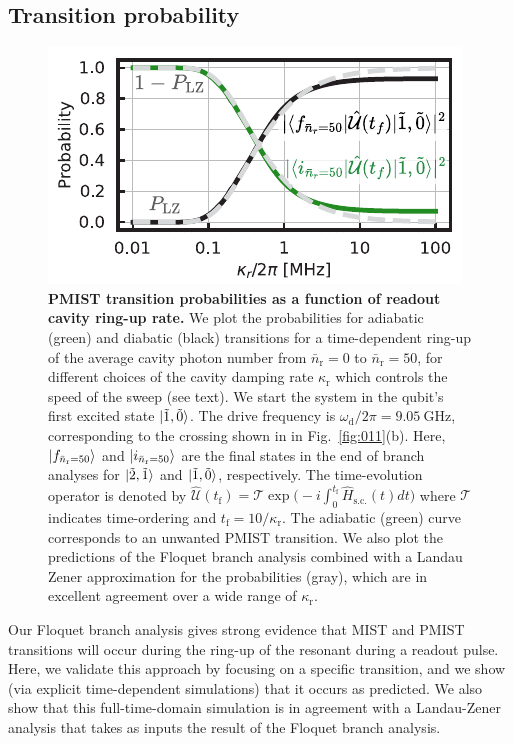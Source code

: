 \documentclass[%
reprint,
superscriptaddress,
 amsmath,amssymb,
 aps,
 prx,
longbibliography,
floatfix,
]{revtex4-2}
\begin{document}
\subsection{Transition probability}\label{sec:LZ}
\begin{figure}[t]
    \centering
    \includegraphics[width=\linewidth]{Figures/LZ.pdf}
    \caption{
    {\bf PMIST transition probabilities as a function of readout cavity ring-up rate.}
    We plot the probabilities for adiabatic (green) and diabatic (black) transitions for a time-dependent ring-up of the average cavity photon number from $\bar{n}_\textrm{r} = 0$ to $\bar{n}_\textrm{r} = 50$, for different choices of the cavity damping rate $\kappa_\textrm{r}$ which controls the speed of the sweep (see text).  We start the system in the qubit's first excited state $\ket{\tilde{1},\tilde{0}}$.  The drive frequency is $\omega_\textrm{d}/2\pi=9.05 \ \mathrm{GHz}$, corresponding to the crossing shown in in Fig.~\ref{fig:011}(b).
    Here, $\ket{f_{\bar n_\textrm{r}=50}}$ and $\ket{i_{\bar n_\textrm{r}=50}}$ are the final states in the end of branch analyses for $\ket{\tilde{2},\tilde{1}}$ and $\ket{\tilde{1},\tilde{0}}$, respectively. The time-evolution operator is denoted by $ \hat{\mathcal{U}}(t_\textrm{f})=\mathcal{T}\exp\big(-i\int^{t_\mathrm{f}}_{0} \hat H_\textrm{s.c.}(t)dt\big)$ where $\mathcal{T}$ indicates time-ordering and $t_\textrm{f}=10/\kappa_\textrm{r}$. The adiabatic (green) curve corresponds to an unwanted PMIST transition.  We also plot the predictions of the Floquet branch analysis combined with a Landau Zener approximation for the probabilities (gray), which are in excellent agreement over a wide range of $\kappa_\textrm{r}$.}
    \label{fig:LZ}
\end{figure}

Our Floquet branch analysis gives strong evidence that MIST and PMIST transitions will occur during the ring-up of the resonant during a readout pulse.  Here, we validate this approach by focusing on a specific transition, and we show (via explicit time-dependent simulations) that it occurs as predicted.  We also show that this full-time-domain simulation is in agreement with a Landau-Zener analysis that takes as inputs the result of the Floquet branch analysis.    
\end{document}
